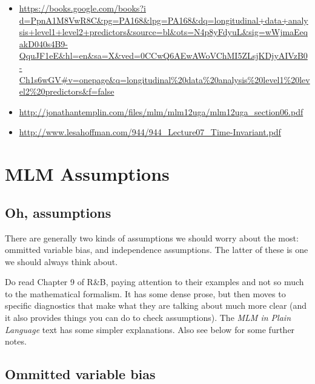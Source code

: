 \documentclass[
  letterpaper,
  DIV=11,
  numbers=noendperiod]{scrreprt}
\begin{document}
\begin{itemize}
\item
  \href{https://books.google.com/books?i\%20d=PpnA1M8VwR8C\&pg=PA168\&lpg=PA168\&dq=longitudinal+data+analysis+level1+level2+predictors\&source=bl\&ots=N4p8yFdyuL\&sig=wWjmaEeqakD040s4B9-QquJF1eE\&hl=en\&sa=X\&ved=0CCwQ6AEwAWoVChMI5ZLsjKDjyAIVzB0-Ch1s6wGV\#v=onepage\&q=longitudinal\%20data\%20analysis\%20level1\%20level2\%20predictors\&f=false}{https://books.google.com/books?i
  d=PpnA1M8VwR8C\&pg=PA168\&lpg=PA168\&dq=longitudinal+data+analysis+level1+level2+predictors\&source=bl\&ots=N4p8yFdyuL\&sig=wWjmaEeqakD040s4B9-QquJF1eE\&hl=en\&sa=X\&ved=0CCwQ6AEwAWoVChMI5ZLsjKDjyAIVzB0-Ch1s6wGV\#v=onepage\&q=longitudinal\%20data\%20analysis\%20level1\%20level2\%20predictors\&f=false}
\item
  \url{http://jonathantemplin.com/files/mlm/mlm12uga/mlm12uga_section06.pdf}
\item
  \url{http://www.lesahoffman.com/944/944_Lecture07_Time-Invariant.pdf}
\end{itemize}

\hypertarget{mlm-assumptions}{%
\chapter{MLM Assumptions}\label{mlm-assumptions}}

\hypertarget{oh-assumptions}{%
\section{Oh, assumptions}\label{oh-assumptions}}

There are generally two kinds of assumptions we should worry about the
most: ommitted variable bias, and independence assumptions. The latter
of these is one we should always think about.

Do read Chapter 9 of R\&B, paying attention to their examples and not so
much to the mathematical formalism. It has some dense prose, but then
moves to specific diagnostics that make what they are talking about much
more clear (and it also provides things you can do to check
assumptions). The \emph{MLM in Plain Language} text has some simpler
explanations. Also see below for some further notes.

\hypertarget{ommitted-variable-bias}{%
\section{Ommitted variable bias}\label{ommitted-variable-bias}}
\end{document}
